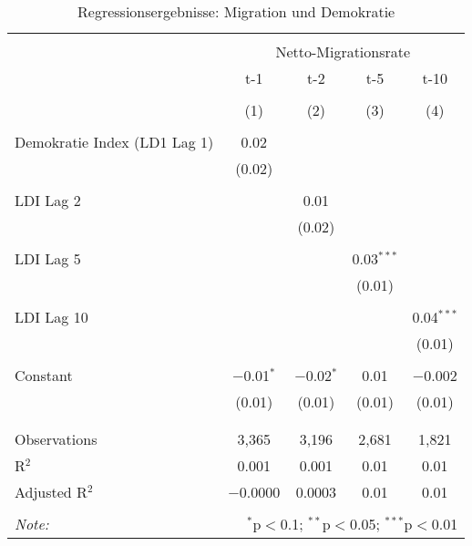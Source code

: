 
\begin{table}[!htbp] \centering 
  \caption{Regressionsergebnisse: Migration und Demokratie} 
  \label{} 
\scriptsize 
\begin{tabular}{@{\extracolsep{2pt}}lcccc} 
\\[-1.8ex]\hline 
\hline \\[-1.8ex] 
 & \multicolumn{4}{c}{Netto-Migrationsrate} \\ 
\cline{2-5} 
 & t-1 & t-2 & t-5 & t-10 \\ 
\\[-1.8ex] & (1) & (2) & (3) & (4)\\ 
\hline \\[-1.8ex] 
 Demokratie Index (LD1 Lag 1) & 0.02 &  &  &  \\ 
  & (0.02) &  &  &  \\ 
  & & & & \\ 
 LDI Lag 2 &  & 0.01 &  &  \\ 
  &  & (0.02) &  &  \\ 
  & & & & \\ 
 LDI Lag 5 &  &  & 0.03$^{***}$ &  \\ 
  &  &  & (0.01) &  \\ 
  & & & & \\ 
 LDI Lag 10 &  &  &  & 0.04$^{***}$ \\ 
  &  &  &  & (0.01) \\ 
  & & & & \\ 
 Constant & $-$0.01$^{*}$ & $-$0.02$^{*}$ & 0.01 & $-$0.002 \\ 
  & (0.01) & (0.01) & (0.01) & (0.01) \\ 
  & & & & \\ 
\hline \\[-1.8ex] 
Observations & 3,365 & 3,196 & 2,681 & 1,821 \\ 
R$^{2}$ & 0.001 & 0.001 & 0.01 & 0.01 \\ 
Adjusted R$^{2}$ & $-$0.0000 & 0.0003 & 0.01 & 0.01 \\ 
\hline 
\hline \\[-1.8ex] 
\textit{Note:}  & \multicolumn{4}{r}{$^{*}$p$<$0.1; $^{**}$p$<$0.05; $^{***}$p$<$0.01} \\ 
\end{tabular} 
\end{table} 
